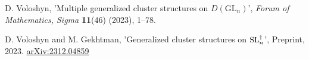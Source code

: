 \begin{thebibliography}{99}






 D. Voloshyn, 'Multiple generalized cluster structures on $D(\mathrm{GL}_n)$', \emph{Forum of Mathematics, Sigma} \textbf{11}(46) (2023), 1--78. 


  D. Voloshyn and M. Gekhtman, 'Generalized cluster structures on $\operatorname{SL}_n^{\dagger}$', Preprint, 2023. \href{https://arxiv.org/abs/2312.04859}{arXiv:2312.04859}  





\end{thebibliography}
